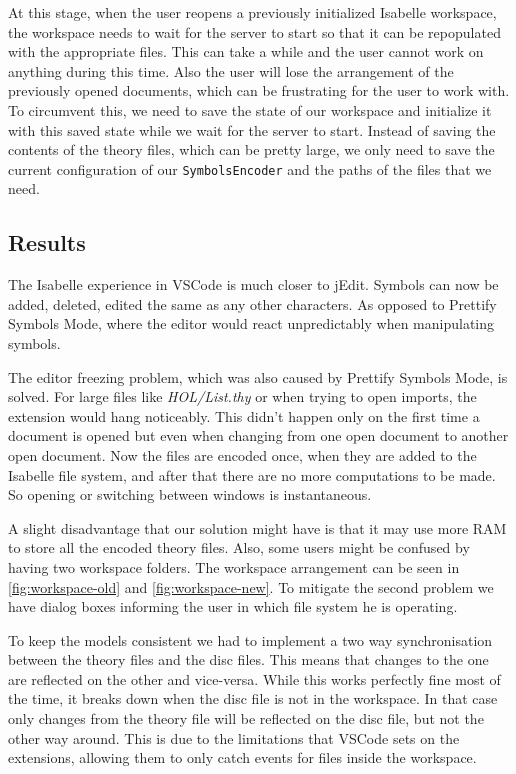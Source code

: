 At this stage, when the user reopens a previously initialized Isabelle workspace, the workspace needs to wait for the server to start so that it can be repopulated with the appropriate files. This can take a while and the user cannot work on anything during this time. Also the user will lose the arrangement of the previously opened documents, which can be frustrating for the user to work with. To circumvent this, we need to save the state of our workspace and initialize it with this saved state while we wait for the server to start. Instead of saving the contents of the theory files, which can be pretty large, we only need to save the current configuration of our \texttt{SymbolsEncoder} and the paths of the files that we need.

\subsection*{Results}
The Isabelle experience in VSCode is much closer to jEdit. Symbols can now be added, deleted, edited the same as any other characters. As opposed to Prettify Symbols Mode, where the editor would react unpredictably when manipulating symbols. 

The editor freezing problem, which was also caused by Prettify Symbols Mode, is solved. For large files like \emph{HOL/List.thy} or when trying to open imports, the extension would hang noticeably. This didn't happen only on the first time a document is opened but even when changing from one open document to another open document. Now the files are encoded once, when they are added to the Isabelle file system, and after that there are no more computations to be made. So opening or switching between windows is instantaneous. 

A slight disadvantage that our solution might have is that it may use more RAM to store all the encoded theory files. Also, some users might be confused by having two workspace folders. The workspace arrangement can be seen in \autoref{fig:workspace-old} and \autoref{fig:workspace-new}.  To mitigate the second problem we have dialog boxes informing the user in which file system he is operating.

To keep the models consistent we had to implement a two way synchronisation between the theory files and the disc files. This means that changes to the one are reflected on the other and vice-versa. While this works perfectly fine most of the time, it breaks down when the disc file is not in the workspace. In that case only changes from the theory file will be reflected on the disc file, but not the other way around. This is due to the limitations that VSCode sets on the extensions, allowing them to only catch events for files inside the workspace.

